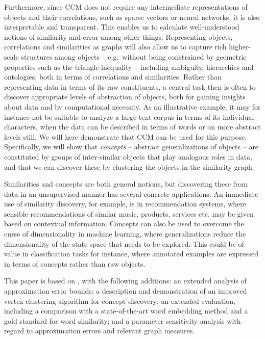 \documentclass{kais}
\begin{document}
Furthermore, since CCM does not require any intermediate representations of objects and their correlations, such as sparse vectors
 or neural networks, it is also interpretable and transparent. This enables us to calculate well-understood notions
of similarity and error among other things. Representing objects, correlations and similarities as graphs will also allow us
 to capture rich higher-scale structures among objects -- e.g.\ without being constrained by geometric properties such as the triangle 
inequality -- including ambiguity, hierarchies and ontologies, both in terms of correlations and similarities.
Rather than representing data in terms of its raw constituents, a central task then is often to discover appropriate levels of abstraction 
of objects, both for gaining insights about data and by computational necessity. As an illustrative example, it may 
for instance not be suitable to analyze a large text corpus in terms of its individual characters, when the data can be described in 
terms of words or on more abstract levels still. We will here demonstrate that CCM can be used for this purpose. Specifically, we will show 
that \emph{concepts} -- abstract generalizations of objects -- are constituted by groups of inter-similar objects that play 
analogous roles in data, and that we can discover these by clustering the objects in the similarity graph.

Similarities and concepts are both general notions, but discovering these from data in an unsupervised manner has several concrete
applications. An immediate use of similarity discovery, for example, is in recommendation systems, where sensible recommendations of
similar music, products, services etc. may be given based on contextual information. Concepts 
can also be used to overcome the curse of dimensionality in machine learning, where generalizations reduce
the dimensionality of the state space that needs to be explored. This could be of value in classification tasks for instance, 
where annotated examples are expressed in terms of concepts rather than raw objects. 

This paper is based on \cite{Gornerup2015}, with the following additions: an extended analysis of approximation error bounds; a description
and demonstration of an improved vertex clustering algorithm for concept discovery; an extended evaluation, including a comparison with a 
state-of-the-art word embedding method and a gold standard for word similarity; and a parameter sensitivity analysis with regard to approximation 
errors and relevant graph measures.
\end{document}
